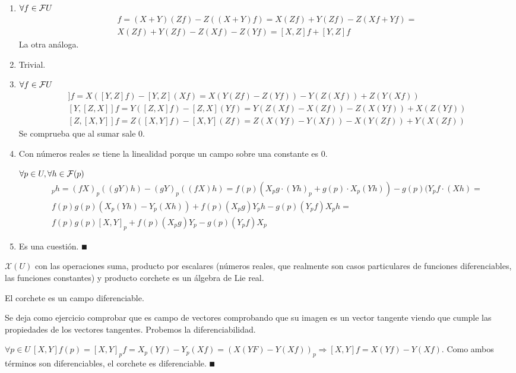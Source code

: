 \documentclass[Cursovd_portada.tex]{subfiles}
\begin{document}
\begin{dem}\
\begin{enumerate}
\item $\forall f\in\mathcal{F}{U}$
\begin{gather*}
[X+Y,Z]f=(X+Y)(Zf)-Z((X+Y)f)=X(Zf)+Y(Zf)-Z(Xf+Yf)=\\
X(Zf)+Y(Zf)-Z(Xf)-Z(Yf)=[X,Z]f+[Y,Z]f
\end{gather*}
La otra análoga.
\item Trivial. 
\item $\forall f\in\mathcal{F}{U}$
\begin{gather*}
[X,[Y,Z]]f=X([Y,Z]f)-[Y,Z](Xf)=X(Y(Zf)-Z(Yf))-Y(Z(Xf))+Z(Y(Xf))\\
[Y,[Z,X]]f=Y([Z,X]f)-[Z,X](Yf)=Y(Z(Xf)-X(Zf))-Z(X(Yf))+X(Z(Yf))\\
[Z,[X,Y]]f=Z([X,Y]f)-[X,Y](Zf)=Z(X(Yf)-Y(Xf))-X(Y(Zf))+Y(X(Zf))
\end{gather*}
Se comprueba que al sumar sale 0.
\item Con números reales se tiene la linealidad porque un campo sobre una constante es 0. 

$\forall p\in U,\forall h\in\mathcal{F}(p)$
\begin{gather*}
[fX,gY]_ph=(fX)_p((gY)h)-(gY)_p((fX)h)=f(p)(X_pg\cdot(Yh)_p+g(p)\cdot X_p(Yh))-g(p)(Y_pf\cdot(Xh)=\\
f(p)g(p)(X_p(Yh)-Y_p(Xh))+f(p)(X_pg)Y_ph-g(p)(Y_pf)X_ph=\\
f(p)g(p)[X,Y]_p+f(p)(X_p g)Y_p-g(p)(Y_pf)X_p
\end{gather*}


\item Es una cuestión. $\QED$
\end{enumerate}
\end{dem}
\begin{coro}
$\mathcal{X}(U)$ con las operaciones suma, producto por escalares (nú\-me\-ros reales, que realmente son casos
particulares de funciones diferenciables, las funciones constantes) y producto corchete es un álgebra de Lie real.
\end{coro}

\begin{prop}
El corchete es un campo diferenciable.
\end{prop}
\begin{dem}
Se deja como ejercicio comprobar que es campo de vectores comprobando que su imagen es un vector tangente viendo que cumple las propiedades de los vectores tangentes. Probemos la diferenciabilidad.

$\forall p\in U\ [X,Y]f(p)=[X,Y]_pf=X_p(Yf)-Y_p(Xf)=(X(YF)-Y(Xf))_p\Rightarrow [X,Y]f=X(Yf)-Y(Xf)$. Como ambos términos son diferenciables, el corchete es diferenciable. $\QED$
\end{dem}
\end{document}
